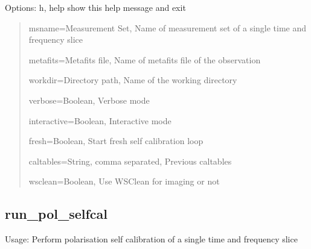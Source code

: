 \documentclass[letterpaper,10pt,english]{sphinxmanual}
\begin{document}
\sphinxAtStartPar
Options:  \sphinxhyphen{}h, \sphinxhyphen{}\sphinxhyphen{}help                           show this help message and exit
\begin{quote}

\sphinxAtStartPar
\sphinxhyphen{}\sphinxhyphen{}msname=Measurement Set,    Name of measurement set of a single time and frequency slice

\sphinxAtStartPar
\sphinxhyphen{}\sphinxhyphen{}metafits=Metafits file,    Name of metafits file of the observation

\sphinxAtStartPar
\sphinxhyphen{}\sphinxhyphen{}workdir=Directory path,    Name of the working directory

\sphinxAtStartPar
\sphinxhyphen{}\sphinxhyphen{}verbose=Boolean,                   Verbose mode

\sphinxAtStartPar
\sphinxhyphen{}\sphinxhyphen{}interactive=Boolean,               Interactive mode

\sphinxAtStartPar
\sphinxhyphen{}\sphinxhyphen{}fresh=Boolean,                     Start fresh self calibration loop

\sphinxAtStartPar
\sphinxhyphen{}\sphinxhyphen{}caltables=String, comma separated, Previous caltables

\sphinxAtStartPar
\sphinxhyphen{}\sphinxhyphen{}wsclean=Boolean,                   Use WSClean for imaging or not
\end{quote}


\subsection{run\_pol\_selfcal}
\label{\detokenize{scripts:run-pol-selfcal}}
\sphinxAtStartPar
Usage:  Perform polarisation self calibration of a single time and frequency slice
\end{document}

